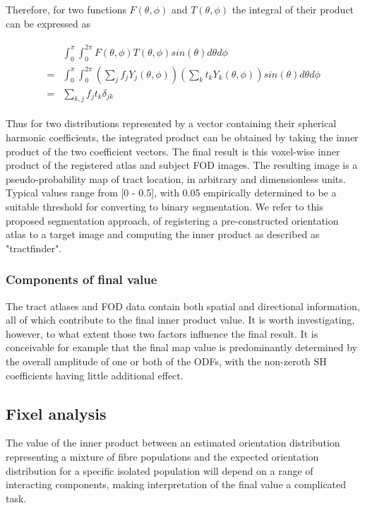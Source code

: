 Therefore, for two functions  $F(\theta, \phi)$ and $T(\theta, \phi)$ the integral of their product can be expressed as

\begin{align}
  \begin{split}
    & \int_0^{\pi} \int_0^{2\pi} F(\theta, \phi) T(\theta, \phi) sin(\theta) d\theta d\phi \\
    = & \int_0^{\pi} \int_0^{2\pi} (\sum_j f_jY_j(\theta, \phi)) (\sum_k t_kY_k(\theta, \phi)) sin(\theta) d\theta d\phi \\
    = & \sum_{k,j} f_j t_k \delta_{jk}
  \end{split}
\end{align}


Thus for two distributions represented by a vector containing their spherical harmonic coefficients, the integrated product can be obtained by taking the inner product of the two coefficient vectors.
The final result is this voxel-wise inner product of the registered atlas and subject FOD images. The resulting image is a pseudo-probability map of tract location, in arbitrary and dimensionless units. Typical values range from [0 - 0.5], with 0.05 empirically determined to be a suitable threshold for converting to binary segmentation.
We refer to this proposed segmentation approach, of registering a pre-constructed orientation atlas to a target image and computing the inner product as described as "tractfinder".


\subsubsection{Components of final value}

The tract atlases and FOD data contain both spatial and directional information, all of which contribute to the final inner product value.
It is worth investigating, however, to what extent those two factors influence the final result.
It is conceivable for example that the final map value is predominantly determined by the overall amplitude of one or both of the ODFs, with the non-zeroth SH coefficients having little additional effect.


\subsection{Fixel analysis}

The value of the inner product between an estimated orientation distribution representing a mixture of fibre populations and the expected orientation distribution for a specific isolated population will depend on a range of interacting components, making interpretation of the final value a complicated task.

